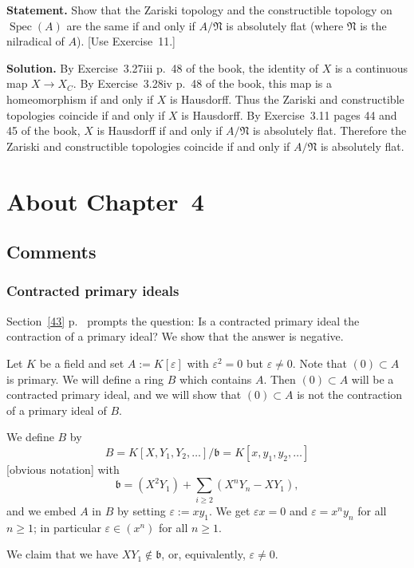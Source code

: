 \documentclass[12pt,letterpaper]{article}%
\newcommand{\mf}{\mathfrak}
\newcommand{\NNN}{\mf N}\newcommand{\RRR}{\mf R}
\newcommand{\Spec}{\operatorname{Spec}}\newcommand{\Sp}{\operatorname{Spec}}
\newcommand{\nn}{\noindent}
\begin{document}
\textbf{Statement.} Show that the Zariski topology and the constructible topology on $\Spec(A)$ are the same if and only if $A/\NNN$ is absolutely flat (where $\NNN$ is the nilradical of $A$). [Use Exercise~11.]

\nn\textbf{Solution.} By Exercise~3.27iii p.~48 of the book, the identity of $X$ is a continuous map $X\to X_C$. By Exercise~3.28iv p.~48 of the book, this map is a homeomorphism if and only if $X$ is Hausdorff. Thus the Zariski and constructible topologies coincide if and only if $X$ is Hausdorff. By Exercise~3.11 pages 44 and 45 of the book, $X$ is Hausdorff if and only if $A/\NNN$ is absolutely flat. Therefore the Zariski and constructible topologies coincide if and only if $A/\NNN$ is absolutely flat.

\newpage 

\section{About Chapter~4}%

\subsection{Comments}%

\subsubsection{Contracted primary ideals}\label{cpi}%

Section~\ref{43} p.~\pageref{43} prompts the question: Is a contracted primary ideal the contraction of a primary ideal? We show that the answer is negative.

Let $K$ be a field and set $A:=K[\varepsilon]$ with $\varepsilon^2=0$ but $\varepsilon\ne0$. Note that $(0)\subset A$ is primary. We will define a ring $B$ which contains $A$. Then $(0)\subset A$ will be a contracted primary ideal, and we will show that $(0)\subset A$ is not the contraction of a primary ideal of $B$. 

We define $B$ by 
$$
B=K[X,Y_1,Y_2,\dots]/\mathfrak b=K[x,y_1,y_2,\dots]
$$ 
[obvious notation] with 
$$
\mathfrak b=(X^2Y_1)+\sum_{i\ge2}(X^nY_n-XY_1),
$$
and we embed $A$ in $B$ by setting $\varepsilon:=xy_1$. We get $\varepsilon x=0$ and $\varepsilon=x^ny_n$ for all $n\ge1$; in particular $\varepsilon\in(x^n)$ for all $n\ge1$.

We claim that we have $XY_1\notin\mathfrak b$, or, equivalently, $\varepsilon\ne0$.
\end{document}
